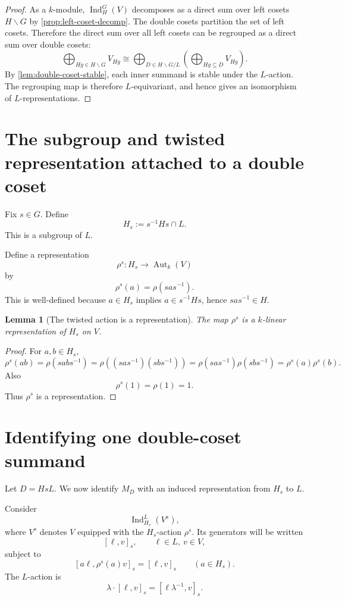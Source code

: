 \documentclass[11pt]{article}
\newtheorem{lemma}[theorem]{Lemma}
\theoremstyle{definition}
\newcommand{\Ind}{\operatorname{Ind}}
\newcommand{\Aut}{\operatorname{Aut}}
\begin{document}
\begin{proof}
As a $k$-module, $\Ind_H^G(V)$ decomposes as a direct sum over left cosets $H\backslash G$ by \cref{prop:left-coset-decomp}. The double cosets partition the set of left cosets. Therefore the direct sum over all left cosets can be regrouped as a direct sum over double cosets:
\[
  \bigoplus_{Hg\in H\backslash G}V_{Hg}
  \cong
  \bigoplus_{D\in H\backslash G/L}\left(\bigoplus_{Hg\subseteq D}V_{Hg}\right).
\]
By \cref{lem:double-coset-stable}, each inner summand is stable under the $L$-action. The regrouping map is therefore $L$-equivariant, and hence gives an isomorphism of $L$-representations.
\end{proof}

\section{The subgroup and twisted representation attached to a double coset}

Fix $s\in G$. Define
\[
  H_s := s^{-1}Hs\cap L.
\]
This is a subgroup of $L$.

Define a representation
\[
  \rho^s : H_s \to \Aut_k(V)
\]
by
\[
  \rho^s(a)=\rho(sas^{-1}).
\]
This is well-defined because $a\in H_s$ implies $a\in s^{-1}Hs$, hence $sas^{-1}\in H$.

\begin{lemma}[The twisted action is a representation]\label{lem:twisted-rep}
The map $\rho^s$ is a $k$-linear representation of $H_s$ on $V$.
\end{lemma}

\begin{proof}
For $a,b\in H_s$,
\[
  \rho^s(ab)
  =
  \rho(sabs^{-1})
  =
  \rho((sas^{-1})(sbs^{-1}))
  =
  \rho(sas^{-1})\rho(sbs^{-1})
  =
  \rho^s(a)\rho^s(b).
\]
Also
\[
  \rho^s(1)=\rho(1)=1.
\]
Thus $\rho^s$ is a representation.
\end{proof}

\section{Identifying one double-coset summand}

Let $D=HsL$. We now identify $M_D$ with an induced representation from $H_s$ to $L$.

Consider
\[
  \Ind_{H_s}^{L}(V^s),
\]
where $V^s$ denotes $V$ equipped with the $H_s$-action $\rho^s$. Its generators will be written
\[
  [\ell,v]_s,
  \qquad \ell\in L,
  \ v\in V,
\]
subject to
\begin{equation}\label{eq:Hs-ind-relation}
  [a\ell,\rho^s(a)v]_s=[\ell,v]_s
  \qquad (a\in H_s).
\end{equation}
The $L$-action is
\begin{equation}\label{eq:ind-L-action}
  \lambda\cdot[\ell,v]_s=[\ell\lambda^{-1},v]_s.
\end{equation}
\end{document}
